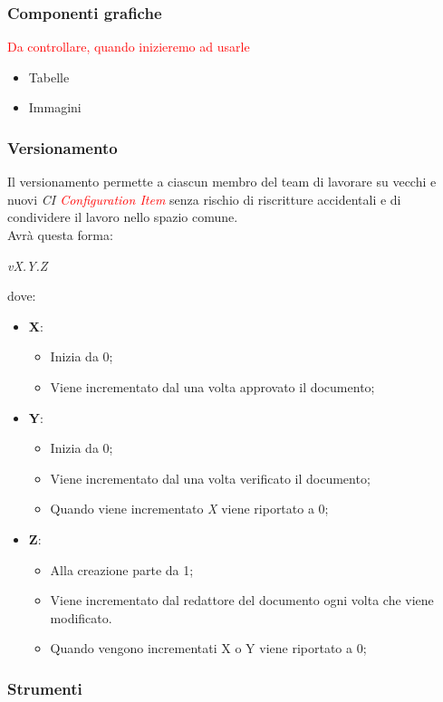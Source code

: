 \subsubsection{Componenti grafiche}
\textcolor{red}{Da controllare, quando inizieremo ad usarle}
\begin{itemize}
	\item Tabelle
	\item Immagini
\end{itemize}
\subsubsection{Versionamento}
Il versionamento permette a ciascun membro del team di lavorare su vecchi e nuovi \emph{CI \textcolor{red}{Configuration Item}} senza rischio di riscritture accidentali e di condividere il lavoro nello spazio comune. 
\\Avrà questa forma:
\begin{center}
	\emph{vX.Y.Z}
\end{center}
dove:
\begin{itemize}
	\item \textbf{X}:
	\begin{itemize}
		\item Inizia da 0;
		\item Viene incrementato dal \emph{\RdP} una volta approvato il documento;
	\end{itemize}
	\item \textbf{Y}:
	\begin{itemize}
		\item Inizia da 0;
		\item Viene incrementato dal \ver una volta verificato il documento;
		\item Quando viene incrementato \emph{X} viene riportato a 0;
	\end{itemize}
	\item \textbf{Z}:
	\begin{itemize}
		\item Alla creazione parte da 1;
		\item Viene incrementato dal redattore del documento ogni volta che viene modificato.
		\item Quando vengono incrementati X o Y viene riportato a 0;
	\end{itemize}
\end{itemize}
\subsubsection{Strumenti}
